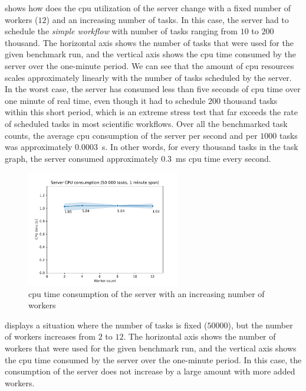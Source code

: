  shows how does the \gls{cpu} utilization of the
server change with a fixed number of workers ($12$) and an increasing number of
tasks. In this case, the server had to schedule the \emph{simple workflow} with number of tasks
ranging from $10$ to $200$ thousand. The horizontal axis shows
the number of tasks that were used for the given benchmark run, and the vertical axis shows the
\gls{cpu} time consumed by the server over the one-minute period. We can see that the
amount of \gls{cpu} resources scales approximately linearly with the number of tasks
scheduled by the server. In the worst case, the server has consumed less than five seconds of
\gls{cpu} time over one minute of real time, even though it had to schedule
$200$ thousand tasks within this short period, which is an extreme stress test
that far exceeds the rate of scheduled tasks in most scientific workflows. Over all the benchmarked
task counts, the average \gls{cpu} consumption of the server per second and per
$1000$ tasks was approximately \SI{0.0003}{\second}. In other words, for every
thousand tasks in the task graph, the server consumed approximately \SI{0.3}{\milli\second}
\gls{cpu} time every second.

\begin{figure}[h]
	\centering
	\includegraphics[width=0.6\textwidth]{imgs/hq/charts/server-utilization-workers}
	\caption{\gls{cpu} time consumption of the \hyperqueue{} server with an increasing
	number of workers}
	\label{fig:hq-server-cpu-consumption-workers}
\end{figure}

 displays a situation where the number of tasks
is fixed ($50000$), but the number of workers increases from
$2$ to $12$. The horizontal axis shows the number of workers
that were used for the given benchmark run, and the vertical axis shows the \gls{cpu}
time consumed by the server over the one-minute period. In this case, the consumption of the server
does not increase by a large amount with more added workers.

